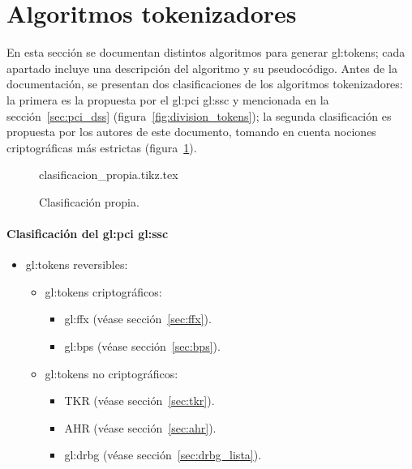 %
%

\section{Algoritmos tokenizadores}
\label{sec:algoritmos}

En esta sección se documentan distintos algoritmos para generar
\glspl{gl:token}; cada apartado incluye una descripción del
algoritmo y su pseudocódigo. Antes de la documentación, se presentan
dos clasificaciones de los algoritmos tokenizadores: la primera es la propuesta
por el \gls{gl:pci} \gls{gl:ssc} y mencionada en la sección~\ref{sec:pci_dss}
(figura~\ref{fig:division_tokens}); la segunda clasificación es propuesta por
los autores de este documento, tomando en cuenta nociones criptográficas más
estrictas (figura~\ref{fig:division_propia}).

\begin{figure}[h]
  \begin{center}
    {clasificacion_propia.tikz.tex}
    \caption{Clasificación propia.}
    \label{fig:division_propia}
  \end{center}
\end{figure}

\paragraph{Clasificación del
  \texorpdfstring{\acrlong{gl:pci}}{PCI} \texorpdfstring{\acrlong{gl:ssc}}{SSC}}

\begin{itemize}
  \item \Glspl{gl:token} reversibles:
    \begin{itemize}
      \item \Glspl{gl:token} criptográficos:
        \begin{itemize}
          \item \Gls{gl:ffx} (véase sección~\ref{sec:ffx}).
          \item \Gls{gl:bps} (véase sección~\ref{sec:bps}).
        \end{itemize}
      \item \Glspl{gl:token} no criptográficos:
        \begin{itemize}
          \item TKR (véase sección~\ref{sec:tkr}).
          \item AHR (véase sección~\ref{sec:ahr}).
          \item \Gls{gl:drbg} (véase sección~\ref{sec:drbg_lista}).
        \end{itemize}
    \end{itemize}
\end{itemize}


